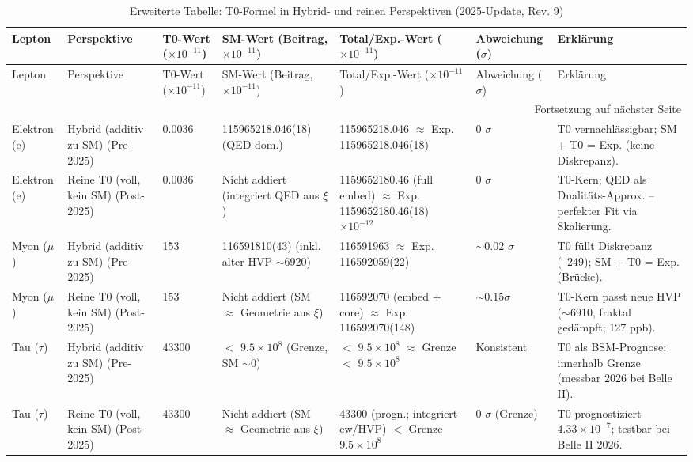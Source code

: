 \documentclass[12pt,a4paper]{article}
\theoremstyle{definition}
\begin{document}
	\begin{longtable}{@{}p{1.5cm}p{2cm}p{1.4cm}p{3cm}p{3cm}p{1.5cm}p{2.5cm}@{}}
		\caption{Erweiterte Tabelle: T0-Formel in Hybrid- und reinen Perspektiven (2025-Update, Rev. 9)} \label{tab:extended_comparison}\\
		\toprule
		Lepton & Perspektive & T0-Wert ($ \times 10^{-11}$) & SM-Wert (Beitrag, $ \times 10^{-11}$) & Total/Exp.-Wert ($ \times 10^{-11}$) & Abweichung ($\sigma$) & Erklärung \\
		\midrule
		\endfirsthead
		
		\toprule
		Lepton & Perspektive & T0-Wert ($ \times 10^{-11}$) & SM-Wert (Beitrag, $ \times 10^{-11}$) & Total/Exp.-Wert ($ \times 10^{-11}$) & Abweichung ($\sigma$) & Erklärung \\
		\midrule
		\endhead
		
		\bottomrule
		\multicolumn{7}{r}{Fortsetzung auf nächster Seite} \\
		\endfoot
		
		Elektron (e) & Hybrid (additiv zu SM) (Pre-2025) & 0.0036 & 115965218.046(18) (QED-dom.) & 115965218.046 $\approx$ Exp. 115965218.046(18) & 0 $\sigma$ & T0 vernachlässigbar; SM + T0 = Exp. (keine Diskrepanz). \\
		Elektron (e) & Reine T0 (voll, kein SM) (Post-2025) & 0.0036 & Nicht addiert (integriert QED aus $\xi$) & 1159652180.46 (full embed) $\approx$ Exp. 1159652180.46(18) $\times 10^{-12}$ & 0 $\sigma$ & T0-Kern; QED als Dualitäts-Approx. -- perfekter Fit via Skalierung. \\
		Myon ($\mu$) & Hybrid (additiv zu SM) (Pre-2025) & 153 & 116591810(43) (inkl. alter HVP $\sim$6920) & 116591963 $\approx$ Exp. 116592059(22) & $\sim$0.02 $\sigma$ & T0 füllt Diskrepanz (~249); SM + T0 = Exp. (Brücke). \\
		Myon ($\mu$) & Reine T0 (voll, kein SM) (Post-2025) & 153 & Nicht addiert (SM $\approx$ Geometrie aus $\xi$) & 116592070 (embed + core) $\approx$ Exp. 116592070(148) & $\sim 0.15 \sigma$ & T0-Kern passt neue HVP ($\sim$6910, fraktal gedämpft; 127 ppb). \\
		Tau ($\tau$) & Hybrid (additiv zu SM) (Pre-2025) & 43300 & $<$ $9.5 \times 10^{8}$ (Grenze, SM $\sim$0) & $<$ $9.5 \times 10^{8}$ $\approx$ Grenze $<$ $9.5 \times 10^{8}$ & Konsistent & T0 als BSM-Prognose; innerhalb Grenze (messbar 2026 bei Belle II). \\
		Tau ($\tau$) & Reine T0 (voll, kein SM) (Post-2025) & 43300 & Nicht addiert (SM $\approx$ Geometrie aus $\xi$) & 43300 (progn.; integriert ew/HVP) $<$ Grenze $9.5 \times 10^{8}$ & 0 $\sigma$ (Grenze) & T0 prognostiziert $4.33 \times 10^{-7}$; testbar bei Belle II 2026. \\
	\end{longtable}
	
\end{document}
